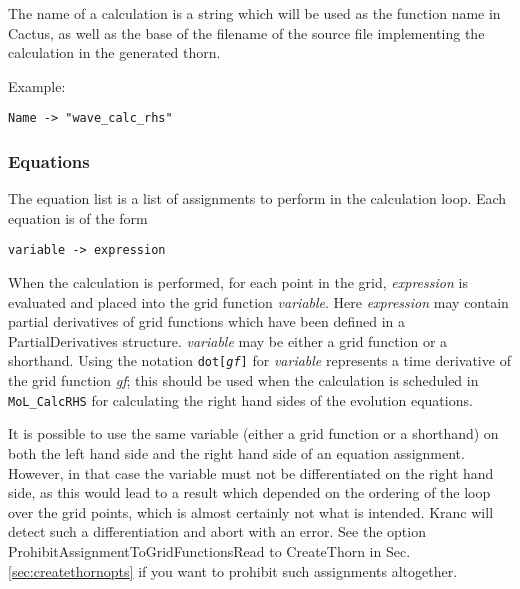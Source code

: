 \documentclass{report}
\begin{document}
The name of a calculation is a string which will be used as the
function name in Cactus, as well as the base of the filename of the
source file implementing the calculation in the generated thorn.

Example:

\begin{center}
\begin{minipage}{0.8 \textwidth}
\begin{verbatim}
Name -> "wave_calc_rhs"
\end{verbatim}
\end{minipage}
\end{center}

\subsubsection{Equations}

The equation list is a list of assignments to perform in the
calculation loop.  Each equation is of the form
\begin{center}
\begin{minipage}{0.8 \textwidth}
\begin{verbatim}
variable -> expression
\end{verbatim}
\end{minipage}
\end{center}
When the calculation is performed, for each point in the grid, {\it
expression} is evaluated and placed into the grid function {\it
variable}.  Here {\it expression} may contain partial derivatives of
grid functions which have been defined in a PartialDerivatives
structure.  {\it variable} may be either a grid function or a
shorthand.  Using the notation {\tt dot[{\it gf}]} for {\it variable}
represents a time derivative of the grid function {\it gf}; this
should be used when the calculation is scheduled in {\tt MoL\_CalcRHS}
for calculating the right hand sides of the evolution equations.

It is possible to use the same variable (either a grid function or a
shorthand) on both the left hand side and the right hand side of an
equation assignment.  However, in that case the variable must not be
differentiated on the right hand side, as this would lead to a result
which depended on the ordering of the loop over the grid points, which
is almost certainly not what is intended.  Kranc will detect such a
differentiation and abort with an error.  See the option
ProhibitAssignmentToGridFunctionsRead to CreateThorn in
Sec.\ref{sec:createthornopts} if you want to prohibit such assignments
altogether.
\end{document}
